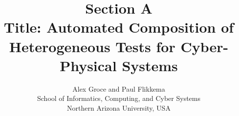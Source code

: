 \documentclass[12pt]{article}
\newcommand{\mycomment}[1]{}
\begin{document}

\title{Section A\\Title: Automated Composition of Heterogeneous Tests for
  Cyber-Physical Systems}

\author{Alex Groce and Paul Flikkema\\
School of Informatics, Computing, and Cyber Systems \\
  Northern Arizona University, USA}




%

\mycomment{

\author{\IEEEauthorblockN{%
Alex Groce,\IEEEauthorrefmark{1}
Josie Holmes\IEEEauthorrefmark{2}
Kevin Kellar\IEEEauthorrefmark{3}
}

\IEEEauthorblockA{\IEEEauthorrefmark{1}%
School of Electrical Engineering and Computer Science\\
Oregon State University\\
\IEEEauthorrefmark{2}
Department of Geography\\
Pennsylvania State University
\IEEEauthorrefmark{3}
Crescent Valley High School
}


}
}
\end{document}
